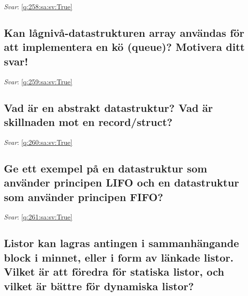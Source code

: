 \documentclass[a4paper,11pt,oneside]{article}
\begin{document}
\begin{sloppypar}
\textit{Svar}: \autoref{q:258:sa:sv:True}



\subsection{Kan l\r{a}gniv\r{a}-datastrukturen array anv\"andas f\"or att implementera en k\"o (queue)? Motivera ditt svar!}

\label{q:259:sa:sv:False}

\vspace{2cm}

\noindent\makebox[\textwidth]{\hrulefill}

\vspace{1cm}

\textit{Svar}: \autoref{q:259:sa:sv:True}



\subsection{Vad \"ar en abstrakt datastruktur? Vad \"ar skillnaden mot en record/struct?}

\label{q:260:sa:sv:False}

\vspace{2cm}

\noindent\makebox[\textwidth]{\hrulefill}

\vspace{1cm}

\textit{Svar}: \autoref{q:260:sa:sv:True}



\subsection{Ge ett exempel p\r{a} en datastruktur som anv\"ander principen LIFO och en datastruktur som anv\"ander principen FIFO?}

\label{q:261:sa:sv:False}

\vspace{2cm}

\noindent\makebox[\textwidth]{\hrulefill}

\vspace{1cm}

\textit{Svar}: \autoref{q:261:sa:sv:True}



\subsection{Listor kan lagras antingen i sammanh\"angande block i minnet, eller i form av l\"ankade listor. Vilket \"ar att f\"oredra f\"or statiska listor, och vilket \"ar b\"attre f\"or dynamiska listor?}


\end{sloppypar}
\end{document}
